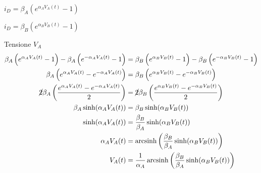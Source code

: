 \documentclass[12pt]{article}
\DeclareMathOperator{\arcsinh}{arcsinh}
\begin{document}
		$i_{D} = \beta_{A}\left(e^{\alpha_{A}V_{A}(t)}-1\right)$
		
		$i_{D} = \beta_{B}\left(e^{\alpha_{B}V_{B}(t)}-1\right)$
		\pagebreak
		
		Tensione $V_{A}$
		\begin{equation}
			\label{eq:corrente}
			\begin{split}
				\beta_{A}\left(e^{\alpha_{A}V_{A}(t)}-1\right)-\beta_{A}\left(e^{-\alpha_{A}V_{A}(t)}-1\right) &= \beta_{B}\left(e^{\alpha_{B}V_{B}(t)}-1\right)-\beta_{B}\left(e^{-\alpha_{B}V_{B}(t)}-1\right)\\
				\beta_{A}\left(e^{\alpha_{A}V_{A}(t)}-e^{-\alpha_{A}V_{A}(t)}\right) &= \beta_{B}\left(e^{\alpha_{B}V_{B}(t)}-e^{-\alpha_{B}V_{B}(t)}\right)\\
				\cancel{2}\beta_{A}\left(\frac{e^{\alpha_{A}V_{A}(t)}-e^{-\alpha_{A}V_{A}(t)}}{2}\right) &= \cancel{2}\beta_{B}\left(\frac{e^{\alpha_{B}V_{B}(t)}-e^{-\alpha_{B}V_{B}(t)}}{2}\right)\\
				\beta_{A} \sinh(\alpha_{A}V_{A}(t)) &= \beta_{B} \sinh(\alpha_{B}V_{B}(t))\\
				\sinh(\alpha_{A}V_{A}(t)) &= \frac{\beta_{B}}{\beta_{A}} \sinh(\alpha_{B}V_{B}(t))\\
				\alpha_{A}V_{A}(t) &= \arcsinh \left(\frac{\beta_{B}}{\beta_{A}} \sinh(\alpha_{B}V_{B}(t))\right)\\
				V_{A}(t) &= \frac{1}{\alpha_{A}} \arcsinh \left(\frac{\beta_{B}}{\beta_{A}} \sinh(\alpha_{B}V_{B}(t))\right)
			\end{split}
		\end{equation}
		
\end{document}
